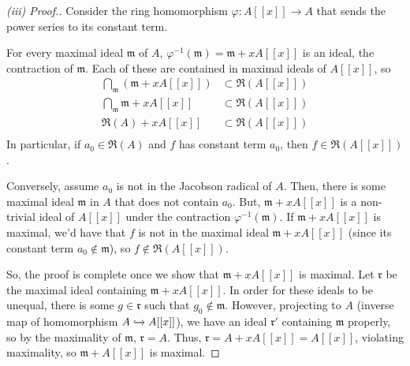 \begin{proof}[(iii) Proof.]
Consider the ring homomorphism $\varphi : A[[x]] \to A$ that sends the power series to its constant term.

For every maximal ideal $\mathfrak{m}$ of $A$, $\varphi^{-1}(\mathfrak{m}) = \mathfrak{m} + xA[[x]]$ is an ideal, the contraction of $\mathfrak{m}$. 
Each of these are contained in maximal ideals of $A[[x]]$, so 
\begin{align*}
\bigcap_{\mathfrak{m}}(\mathfrak{m} + xA[[x]]) &\subset \mathfrak{R}(A[[x]]) \\
\bigcap_{\mathfrak{m}}\mathfrak{m} + xA[[x]] &\subset \mathfrak{R}(A[[x]])\\
\mathfrak{R}(A) + xA[[x]] &\subset \mathfrak{R}(A[[x]])\\
\end{align*}
In particular, if $a_0 \in \mathfrak{R}(A)$ and $f$ has constant term $a_0$, then $f \in \mathfrak{R}(A[[x]])$.

Conversely, assume $a_0$ is not in the Jacobson radical of $A$. Then, there is some maximal ideal $\mathfrak{m}$ in $A$ that does not contain $a_0$. 
But, $\mathfrak{m} + xA[[x]]$ is a non-trivial ideal of $A[[x]]$ under the contraction $\varphi^{-1}(\mathfrak{m})$. If $\mathfrak{m} + xA[[x]]$ is maximal, 
we'd have that $f$ is not in the maximal ideal $\mathfrak{m} + xA[[x]]$ (since its constant term $a_0 \not\in \mathfrak{m}$), so 
$f \not\in \mathfrak{R}(A[[x]])$.

So, the proof is complete once we show that $\mathfrak{m} + xA[[x]]$ is maximal. Let $\mathfrak{r}$ be the maximal ideal containing $\mathfrak{m} + xA[[x]]$. In order for 
these ideals to be unequal, there is some $g \in \mathfrak{r}$ such that $g_0 \not\in \mathfrak{m}$. However, projecting to $A$ (inverse map of homomorphism $A \xhookrightarrow{} A[[x]]$), 
we have an ideal $\mathfrak{r}'$ containing $\mathfrak{m}$ 
properly, so by the maximality of $\mathfrak{m}$, $\mathfrak{r} = A$. Thus, $\mathfrak{r} = A + xA[[x]] = A[[x]]$, violating maximality, so $\mathfrak{m} + A[[x]]$
is maximal.
\end{proof}

